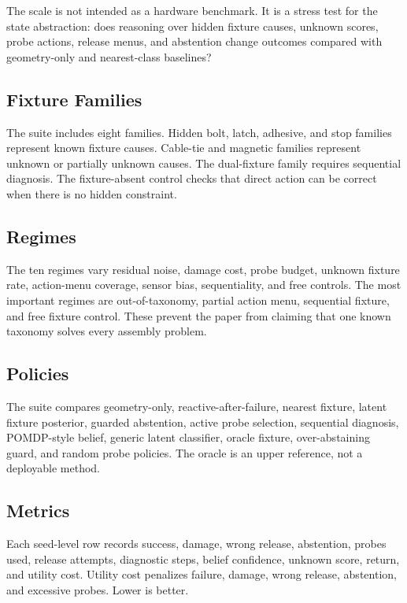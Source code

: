 \documentclass{article}
\begin{document}
The scale is not intended as a hardware benchmark. It is a stress test for the
state abstraction: does reasoning over hidden fixture causes, unknown scores,
probe actions, release menus, and abstention change outcomes compared with
geometry-only and nearest-class baselines?

\subsection{Fixture Families}

The suite includes eight families. Hidden bolt, latch, adhesive, and stop
families represent known fixture causes. Cable-tie and magnetic families
represent unknown or partially unknown causes. The dual-fixture family
requires sequential diagnosis. The fixture-absent control checks that direct
action can be correct when there is no hidden constraint.

\subsection{Regimes}

The ten regimes vary residual noise, damage cost, probe budget, unknown
fixture rate, action-menu coverage, sensor bias, sequentiality, and free
controls. The most important regimes are out-of-taxonomy, partial action menu,
sequential fixture, and free fixture control. These prevent the paper from
claiming that one known taxonomy solves every assembly problem.

\subsection{Policies}

The suite compares geometry-only, reactive-after-failure, nearest fixture,
latent fixture posterior, guarded abstention, active probe selection,
sequential diagnosis, POMDP-style belief, generic latent classifier, oracle
fixture, over-abstaining guard, and random probe policies. The oracle is an
upper reference, not a deployable method.

\subsection{Metrics}

Each seed-level row records success, damage, wrong release, abstention, probes
used, release attempts, diagnostic steps, belief confidence, unknown score,
return, and utility cost. Utility cost penalizes failure, damage, wrong
release, abstention, and excessive probes. Lower is better.
\end{document}
